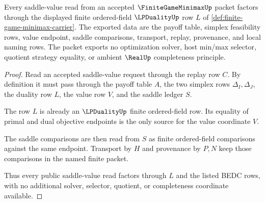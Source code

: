 \begin{theorem}
\label{thm:finite-game-minimax-lpduality-handoff}
Every saddle-value read from an accepted $\FiniteGameMinimaxUp$ packet factors through the displayed finite ordered-field $\LPDualityUp$ row $L$ of \autoref{def:finite-game-minimax-carrier}. The exported data are the payoff table, simplex feasibility rows, value endpoint, saddle comparisons, transport, replay, provenance, and local naming rows. The packet exports no optimization solver, host min/max selector, quotient strategy equality, or ambient $\RealUp$ completeness principle.
\end{theorem}
\begin{proof}
Read an accepted saddle-value request through the replay row $C$. By definition it must pass through the payoff table $A$, the two simplex rows $\Delta_I,\Delta_J$, the duality row $L$, the value row $V$, and the saddle ledger $S$.

The row $L$ is already an $\LPDualityUp$ finite ordered-field row. Its equality of primal and dual objective endpoints is the only source for the value coordinate $V$.

The saddle comparisons are then read from $S$ as finite ordered-field comparisons against the same endpoint. Transport by $H$ and provenance by $P,N$ keep those comparisons in the named finite packet.

Thus every public saddle-value read factors through $L$ and the listed BEDC rows, with no additional solver, selector, quotient, or completeness coordinate available.
\end{proof}


\begin{closurestatus}{\FiniteGameMinimaxUp}
  \theoryclosure{\seedClosure}
  \formalstatus{\unformalizedV}
\end{closurestatus}
